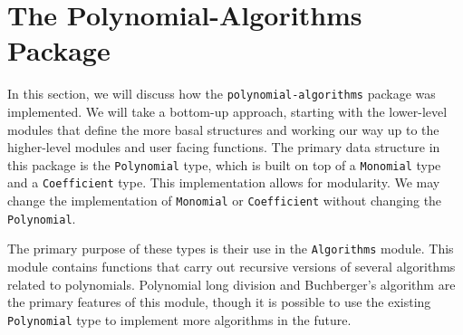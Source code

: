 \documentclass[MS, xcolor=dvipsnames]{wfuthesis}
\theoremstyle{definition}
\begin{document}
\chapter{The Polynomial-Algorithms Package}
In this section, we will discuss how the \lstinline{polynomial-algorithms} package was implemented. We will take a bottom-up approach, starting with the lower-level modules that define the more basal structures and working our way up to the higher-level modules and user facing functions. The primary data structure in this package is the \lstinline{Polynomial} type, which is built on top of a \lstinline{Monomial} type and a \lstinline{Coefficient} type. This implementation allows for modularity. We may change the implementation of \lstinline{Monomial} or \lstinline{Coefficient} without changing the \lstinline{Polynomial}. \par 
The primary purpose of these types is their use in the \lstinline{Algorithms} module. This module contains functions that carry out recursive versions of several algorithms related to polynomials. Polynomial long division and Buchberger's algorithm are the primary features of this module, though it is possible to use the existing \lstinline{Polynomial} type to implement more algorithms in the future. 
\end{document}
